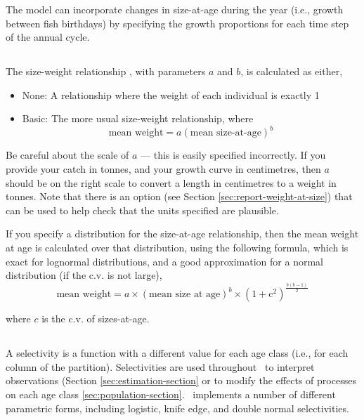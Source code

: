 The model can incorporate changes in size-at-age during the year (i.e., growth between fish birthdays) by specifying the growth proportions for each time step of the annual cycle.

\subsection{\label{sec:mean-weight}}

The size-weight relationship \NYI, with parameters $a$ and $b$, is calculated as either,

\begin{itemize}
  \item{None:} A relationship where the weight of each individual is exactly 1 
  \item{Basic:} The more usual size-weight relationship, where 
  \begin{equation}
    \text{mean weight}=a(\text{mean size-at-age})^b
  \end{equation}
\end{itemize}
  
Be careful about the scale of $a$ --- this is easily specified incorrectly. If you provide your catch in tonnes, and your growth curve in centimetres, then $a$ should be on the right scale to convert a length in centimetres to a weight in tonnes. Note that there is an option  (see Section \ref{sec:report-weight-at-size}) that can be used to help check that the units specified are plausible.

If you specify a distribution for the size-at-age relationship, then the mean weight at age is calculated over that distribution, using the following formula, which is exact for lognormal distributions, and a good approximation for a normal distribution (if the c.v. is not large),
\begin{equation}
	\text{mean weight}=a \times (\text{mean size at age})^b \times \left( 1+\text{c}^2 \right)^{\frac{b(b-1)}{2}}
\end{equation}

where $c$ is the c.v. of sizes-at-age.

\subsection{\label{sec:selectivities}}

A selectivity is a function with a different value for each age class (i.e., for each column of the partition). Selectivities are used throughout \SPM\ to interpret observations (Section \ref{sec:estimation-section} or to modify the effects of processes on each age class \ref{sec:population-section}. \SPM\ implements a number of different parametric forms, including logistic, knife edge, and double normal selectivities.

